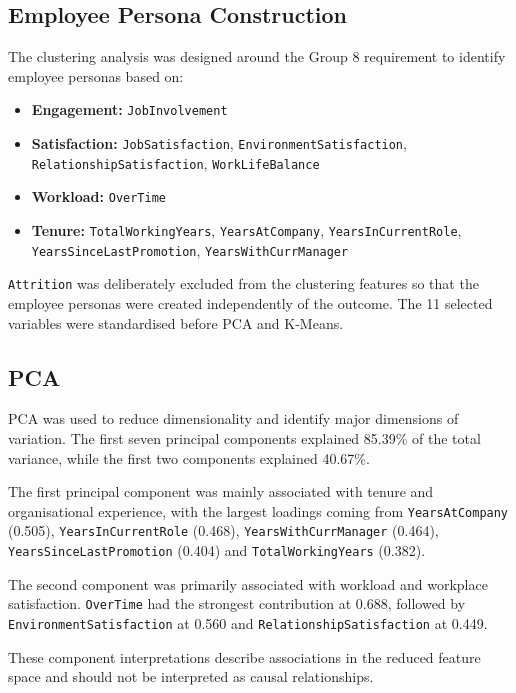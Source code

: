 \documentclass[11pt]{article}
\begin{document}
\subsection{Employee Persona Construction}

The clustering analysis was designed around the Group 8 requirement to identify employee personas based on:

\begin{itemize}
    \item \textbf{Engagement:} \texttt{JobInvolvement}
    \item \textbf{Satisfaction:} \texttt{JobSatisfaction}, \texttt{EnvironmentSatisfaction}, \texttt{RelationshipSatisfaction}, \texttt{WorkLifeBalance}
    \item \textbf{Workload:} \texttt{OverTime}
    \item \textbf{Tenure:} \texttt{TotalWorkingYears}, \texttt{YearsAtCompany}, \texttt{YearsInCurrentRole}, \texttt{YearsSinceLastPromotion}, \texttt{YearsWithCurrManager}
\end{itemize}

\texttt{Attrition} was deliberately excluded from the clustering features so that the employee personas were created independently of the outcome. The 11 selected variables were standardised before PCA and K-Means.


\subsection{PCA}

PCA was used to reduce dimensionality and identify major dimensions of variation. The first seven principal components explained 85.39\% of the total variance, while the first two components explained 40.67\%.

The first principal component was mainly associated with tenure and organisational experience, with the largest loadings coming from \texttt{YearsAtCompany} (0.505), \texttt{YearsInCurrentRole} (0.468), \texttt{YearsWithCurrManager} (0.464), \texttt{YearsSinceLastPromotion} (0.404) and \texttt{TotalWorkingYears} (0.382).

The second component was primarily associated with workload and workplace satisfaction. \texttt{OverTime} had the strongest contribution at 0.688, followed by \texttt{EnvironmentSatisfaction} at 0.560 and \texttt{RelationshipSatisfaction} at 0.449.

These component interpretations describe associations in the reduced feature space and should not be interpreted as causal relationships.
\end{document}
